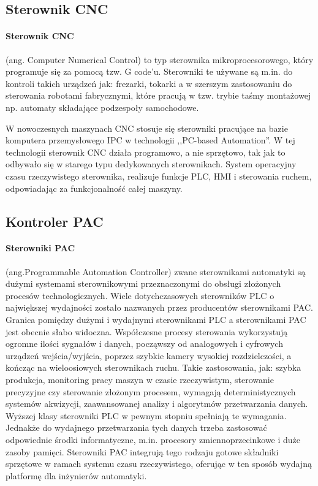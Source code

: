 \documentclass[a4paper,twoside]{report}
\begin{document}
\subsection{Sterownik CNC}
\paragraph{Sterownik CNC} (ang. Computer Numerical Control) to typ sterownika mikroprocesorowego, który programuje się za pomocą tzw. G code'u. Sterowniki te używane są m.in. do kontroli takich urządzeń jak: frezarki, tokarki a w szerszym zastosowaniu do sterowania robotami fabrycznymi, które pracują w tzw. trybie taśmy montażowej np. automaty składające podzespoły samochodowe.

W nowoczesnych maszynach CNC stosuje się sterowniki pracujące na bazie komputera przemysłowego IPC w technologii ,,PC-based Automation''. W tej technologii sterownik CNC działa programowo, a nie sprzętowo, tak jak to odbywało się w starego typu dedykowanych sterownikach. System operacyjny czasu rzeczywistego sterownika, realizuje funkcje PLC, HMI i sterowania ruchem, odpowiadając za funkcjonalność całej maszyny.

\subsection{Kontroler PAC}
\paragraph{Sterowniki PAC} (ang.Programmable Automation Controller) zwane sterownikami automatyki są dużymi systemami sterownikowymi przeznaczonymi do obsługi złożonych procesów technologicznych. Wiele dotychczasowych sterowników PLC o największej wydajności zostało nazwanych przez producentów sterownikami PAC. Granica pomiędzy dużymi i wydajnymi sterownikami PLC a sterownikami PAC jest obecnie słabo widoczna.
Współczesne procesy sterowania wykorzystują ogromne ilości sygnałów i danych, począwszy od analogowych i cyfrowych urządzeń wejścia/wyjścia, poprzez szybkie kamery wysokiej rozdzielczości, a kończąc na wieloosiowych
sterownikach ruchu. Takie zastosowania, jak: szybka produkcja, monitoring pracy maszyn w czasie rzeczywistym, sterowanie precyzyjne czy sterowanie złożonym procesem, wymagają deterministycznych systemów akwizycji, zaawansowanej analizy i algorytmów przetwarzania danych. Wyższej klasy sterowniki PLC w pewnym stopniu spełniają te wymagania. Jednakże do wydajnego przetwarzania tych danych trzeba zastosować odpowiednie środki informatyczne, m.in. procesory zmiennoprzecinkowe i duże zasoby pamięci. Sterowniki PAC integrują tego rodzaju gotowe składniki sprzętowe w ramach systemu czasu rzeczywistego, oferując w ten sposób wydajną platformę dla inżynierów automatyki.
\end{document}

